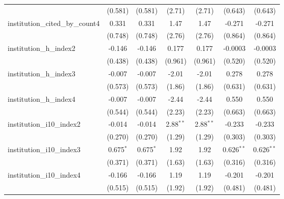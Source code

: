 \begin{tabular}{lcccccc}
                                         & (0.581)        & (0.581)        & (2.71)        & (2.71)        & (0.643)       & (0.643)\\   
   institution\_cited\_by\_count4        & 0.331          & 0.331          & 1.47          & 1.47          & -0.271        & -0.271\\   
                                         & (0.748)        & (0.748)        & (2.76)        & (2.76)        & (0.864)       & (0.864)\\   
   institution\_h\_index2                & -0.146         & -0.146         & 0.177         & 0.177         & -0.0003       & -0.0003\\   
                                         & (0.438)        & (0.438)        & (0.961)       & (0.961)       & (0.520)       & (0.520)\\   
   institution\_h\_index3                & -0.007         & -0.007         & -2.01         & -2.01         & 0.278         & 0.278\\   
                                         & (0.573)        & (0.573)        & (1.86)        & (1.86)        & (0.631)       & (0.631)\\   
   institution\_h\_index4                & -0.007         & -0.007         & -2.44         & -2.44         & 0.550         & 0.550\\   
                                         & (0.544)        & (0.544)        & (2.23)        & (2.23)        & (0.663)       & (0.663)\\   
   institution\_i10\_index2              & -0.014         & -0.014         & 2.88$^{**}$   & 2.88$^{**}$   & -0.233        & -0.233\\   
                                         & (0.270)        & (0.270)        & (1.29)        & (1.29)        & (0.303)       & (0.303)\\   
   institution\_i10\_index3              & 0.675$^{*}$    & 0.675$^{*}$    & 1.92          & 1.92          & 0.626$^{**}$  & 0.626$^{**}$\\   
                                         & (0.371)        & (0.371)        & (1.63)        & (1.63)        & (0.316)       & (0.316)\\   
   institution\_i10\_index4              & -0.166         & -0.166         & 1.19          & 1.19          & -0.201        & -0.201\\   
                                         & (0.515)        & (0.515)        & (1.92)        & (1.92)        & (0.481)       & (0.481)\\   

\end{tabular}
